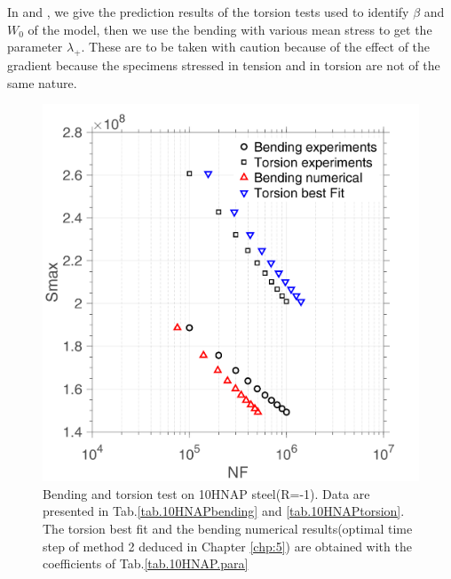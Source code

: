 In  and , we give the prediction results of the torsion tests used to identify $\beta$ and $W_0$ of the model, then we use the bending with various mean stress to get the parameter $\lambda_+$. These are to be taken with caution because of the effect of the gradient because the specimens stressed in tension and in torsion are not of the same nature.
\begin{figure}[!h]
	\centering
	\includegraphics[width=\textwidth]{figures//10HNAP_bt1D_sn.png} 
	\caption{Bending and torsion test on 10HNAP steel(R=-1). Data are presented in Tab.\ref{tab.10HNAPbending} and  \ref{tab.10HNAPtorsion}. The torsion best fit and the bending numerical results(optimal time step of method 2 deduced in Chapter \ref{chp:5}) are obtained with the coefficients of Tab.\ref{tab.10HNAP.para}}
	\label{fig.bt1D10HNAPsn}
\end{figure}
